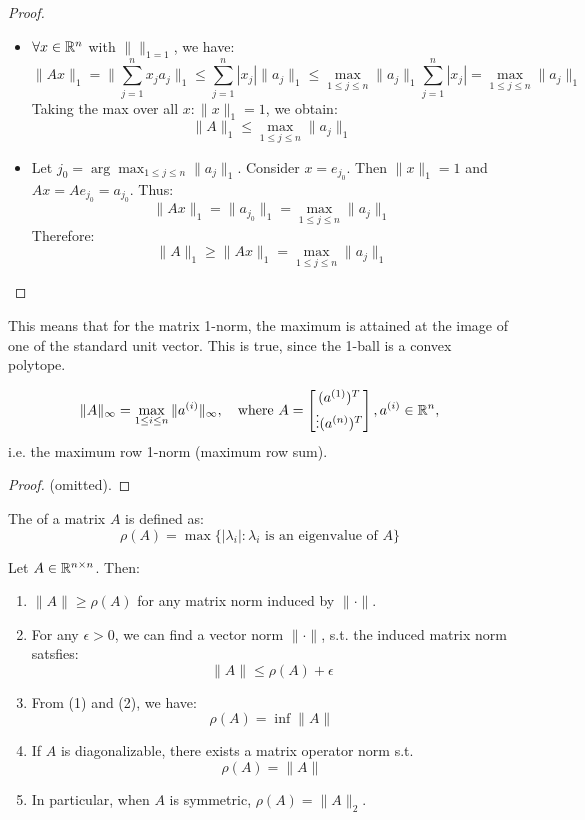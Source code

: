 \documentclass[../main/main.tex]{subfiles}
\begin{document}
\begin{proof}
\begin{itemize}
  \item $\forall x \in\mathbb{R}^{n}$ with $\|\|_{1 = 1}$, we have: \[
        \|Ax\|_{1} = \|\sum_{j=1}^n x_{j}a_{j}\|_{1} \leq \sum_{j=1}^n |x_{j}| \|a_{j}\|_{1} \leq \max_{1\leq j\leq n} \|a_{j}\|_{1} \sum_{j=1}^n |x_{j}| = \max_{1\leq j\leq n} \|a_{j}\|_{1}
        \]
        Taking the max over all $x: \|x\|_{1}=1$, we obtain: \[
\|A\|_{1} \leq \max_{1\leq j\leq n} \|a_{j}\|_{1}
        \]
  \item Let $j_{0} = \arg\max_{1\leq j\leq n} \|a_{j}\|_{1}$. Consider $x=e_{j_{0}}$. Then $\|x\|_{1}=1$ and $Ax=Ae_{j_{0}}= a_{j_{0}}$. Thus: \[
\|Ax\|_{1}= \|a_{j_{0}}\|_{1} = \max_{1\leq j\leq n} \|a_{j}\|_{1}
        \] Therefore: \[
        \|A\|_{1}\geq \|Ax\|_{1} =\max_{1\leq j\leq n} \|a_{j}\|_{1} \]
\end{itemize}
\end{proof}
\begin{remark}
This means that for the matrix 1-norm, the maximum is attained at the image of one of the standard unit vector. This is true, since the 1-ball is a convex polytope.
\end{remark}
\begin{theorem}
  \[
    \|A\|_{\infty}= \max_{1\leq i \leq n}\|a^{(i)}\|_{\infty}, \quad\text{where }A = \begin{bmatrix}
(a^{(1)})^{T}\\
\vdots
(a^{(n)})^{T}\\
    \end{bmatrix} , a^{(i)}\in\mathbb{R}^{n}
 , \] i.e. the maximum row 1-norm (maximum row sum).
\end{theorem}
\begin{proof}
  (omitted).
\end{proof}
\begin{definition}
  The  of a matrix $A$ is defined as: \[
    \rho(A) = \max \{|\lambda_{i}| : \lambda_{i} \text{ is an eigenvalue of }A
    \}\]
\end{definition}
\begin{theorem}
  Let $A\in\mathbb{R}^{n\times n}$. Then:
  \begin{enumerate}
\item $\|A\|\geq \rho(A)$ for any matrix norm induced by $\|\cdot\|$.
    \item For any $\epsilon>0$, we can find a vector norm $\|\cdot\|$, s.t. the induced matrix norm satsfies: \[
          \|A\|\leq \rho(A)+\epsilon
          \]
          \item
  From (1) and (2), we have: \[
          \rho(A) = \inf \|A\|
          \]
    \item If $A$ is diagonalizable, there exists a matrix operator norm s.t. \[
          \rho(A) = \|A\|
          \]
          \item In particular, when $A$ is symmetric, $\rho(A) = \|A\|_{2}$.
  \end{enumerate}
\end{theorem}
\end{document}
